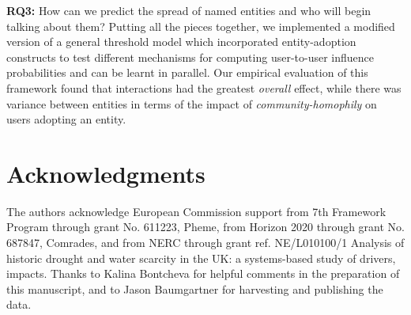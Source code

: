 \documentclass[sigconf]{acmart}
\begin{document}
 \textbf{RQ3:} How can we predict the spread of named entities and who will begin talking about them?	
Putting all the pieces together, we implemented a modified version of a general threshold model which incorporated entity-adoption constructs to test different mechanisms for computing user-to-user influence probabilities and can be learnt in parallel.
Our empirical evaluation of this framework found that interactions had the greatest \emph{overall} effect, while there was variance between entities in terms of the impact of \emph{community-homophily} on users adopting an entity.

\section*{Acknowledgments}
The authors acknowledge European Commission support from 7th Framework Program through grant No. 611223, {\sc Pheme}, from Horizon 2020 through grant No. 687847, Comrades, and from NERC through grant ref. NE/L010100/1 Analysis of historic drought and water scarcity in the UK: a systems-based study of drivers, impacts. Thanks to Kalina Bontcheva for helpful comments in the preparation of this manuscript, and to Jason Baumgartner for harvesting and publishing the data.



\end{document}
